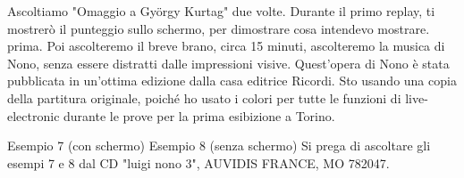 Ascoltiamo "Omaggio a György Kurtag" due volte. Durante il primo replay, ti mostrerò il punteggio sullo schermo, per dimostrare cosa intendevo mostrare. prima. Poi ascolteremo il breve brano, circa 15 minuti, ascolteremo la musica di Nono, senza essere distratti dalle impressioni visive. Quest'opera di Nono è stata pubblicata in un'ottima edizione dalla casa editrice Ricordi. Sto usando una copia della partitura originale, poiché ho usato i colori per tutte le funzioni di live-electronic durante le prove per la prima esibizione a Torino. 

Esempio 7 (con schermo) 
Esempio 8 (senza schermo) Si prega di ascoltare gli esempi 7 e 8 dal CD "luigi nono 3", AUVIDIS FRANCE, MO 782047.